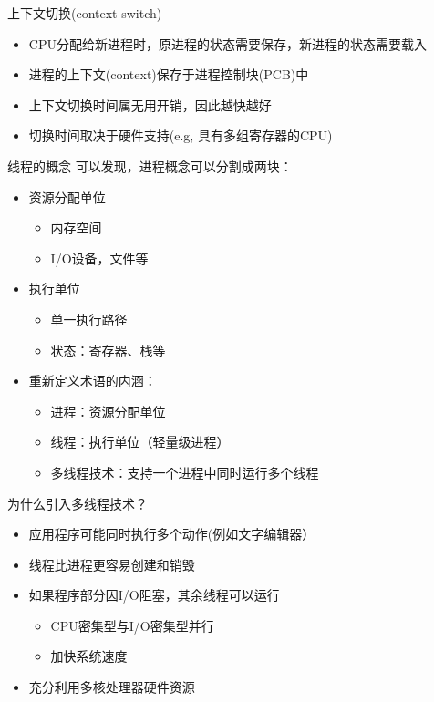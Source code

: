 \documentclass[xcolor=svgnames]{beamer}
\begin{document}
\begin{CJK*}{UTF8}{gbsn}
\begin{frame}{上下文切换(context switch)}
\begin{itemize}
\item CPU分配给新进程时，原进程的状态需要保存，新进程的状态需要载入
\item 进程的上下文(context)保存于进程控制块(PCB)中
\item 上下文切换时间属无用开销，因此越快越好
\item 切换时间取决于硬件支持(e.g, 具有多组寄存器的CPU)
\end{itemize}
\end{frame}

\begin{frame}{线程的概念}
可以发现，进程概念可以分割成两块：
\begin{itemize}
\item 资源分配单位
\begin{itemize}
\item 内存空间
\item I/O设备，文件等
\end{itemize}
\item 执行单位
\begin{itemize}
\item 单一执行路径
\item 状态：寄存器、栈等
\end{itemize}
\item 重新定义术语的内涵：
\begin{itemize}
\item 进程：资源分配单位
\item 线程：执行单位（轻量级进程）
\item 多线程技术：支持一个进程中同时运行多个线程
\end{itemize}
\end{itemize}
\end{frame}

\begin{frame}{为什么引入多线程技术？}
\begin{itemize}
\item 应用程序可能同时执行多个动作(例如文字编辑器）
\item 线程比进程更容易创建和销毁
\item 如果程序部分因I/O阻塞，其余线程可以运行
\begin{itemize}
\item CPU密集型与I/O密集型并行
\item 加快系统速度
\end{itemize}
\item 充分利用多核处理器硬件资源
\end{itemize}
\end{frame}


\end{CJK*}
\end{document}
